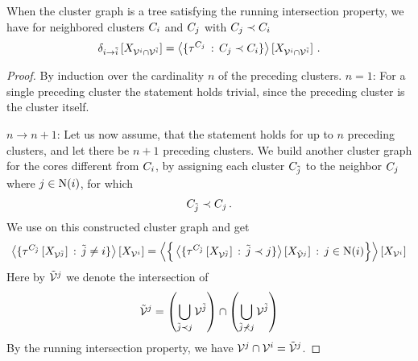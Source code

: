 \begin{lemma}\label{lem:clusterContractionMessage}
	When the cluster graph is a tree satisfying the running intersection property, we have for neighbored clusters $C_{i}$ and $C_{j}$ with $C_{j}\prec C_{i}$
	\begin{align*}
		\delta_{i \rightarrow \tilde{i}}\left[X_{\mathcal{V}^{i}\cap\mathcal{V}^{\tilde{i}}}\right]
		= \left\langle \{\tau^{C_{j}}\,:\,C_{j}\prec C_{i}\}\right\rangle \left[ X_{\mathcal{V}^{i}\cap\mathcal{V}^{\tilde{i}}} \right]   \, .
	\end{align*}
\end{lemma}
\begin{proof}
	By induction over the cardinality $n$ of the preceding clusters.
	\textbf{$n=1$}: For a single preceding cluster the statement holds trivial, since the preceding cluster is the cluster itself.

	\textbf{$n\rightarrow n+1$}: Let us now assume, that the statement holds for up to $n$ preceding clusters, and let there be $n+1$ preceding clusters.
	We build another cluster graph for the cores different from $C_{i}$, by assigning each cluster $C_{\tilde{j}}$ to the neighbor $C_{j}$ where $j\in\mathrm{N}(i)$, for which
	\begin{align*}
		C_{\tilde{j}}\prec C_{j} \, .
	\end{align*}
	We use  on this constructed cluster graph and get
	\begin{align*}
		\left\langle \{\tau^{C_{\tilde{j}}}\left[X_{\mathcal{V}^{\tilde{j}}}\right] \,:\, \tilde{j}\neq i\}\right\rangle \left[ X_{\mathcal{V}^{i}} \right]
		= \left\langle 
			\Big\{ \left\langle 
				\{\tau^{C_{\tilde{j}}}\left[X_{\mathcal{V}^{\tilde{j}}}\right] \,:\, \tilde{j}\prec j\}
			\right\rangle \left[ X_{\tilde{\mathcal{V}}^{j}} \right]
			\,:\, j\in\mathrm{N}(i) \Big\}
			\right\rangle \left[ X_{\mathcal{V}^{i}} \right]
	\end{align*}
	Here by $\tilde{\mathcal{V}}^{j}$ we denote the intersection of
	\begin{align*}
		\tilde{\mathcal{V}}^{j} = \left(\bigcup_{\tilde{j}\prec j} \mathcal{V}^{\tilde{j}}\right) \cap \left(\bigcup_{\tilde{j}\nprec j} \mathcal{V}^{\tilde{j}}\right)
	\end{align*}
	By the running intersection property, we have $\mathcal{V}^{j}\cap\mathcal{V}^{i}=\tilde{\mathcal{V}}^{j}$.


\end{proof}
